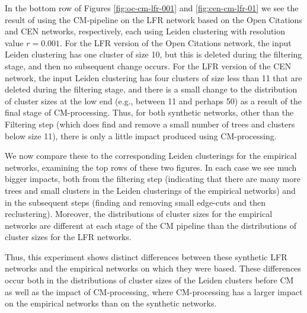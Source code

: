 \documentclass[11pt]{article}   	%
\begin{document}
In the bottom row of Figures \ref{fig:oc-cm-lfr-001} and  \ref{fig:cen-cm-lfr-01} we see the result of using the CM-pipeline on the LFR network based on the Open Citations  and CEN networks, respectively, each using Leiden clustering with
resolution value $r=0.001$.
For the LFR version of the Open Citations network, the input Leiden clustering has one cluster of size 10, but this is deleted during the filtering stage, and then no subsequent change occurs.
For the LFR version of the CEN network, the input Leiden clustering has four clusters of size less than 11 that are  deleted during the filtering stage, and there is a small change to the distribution of cluster sizes at the low end (e.g., between 11 and perhaps 50) as a result of the final stage of CM-processing.
Thus, for both synthetic networks, other than the Filtering step (which does find and remove a small number of trees and clusters below size 11), there is only a little
impact produced using CM-processing.

We now compare these to the corresponding Leiden clusterings for the empirical networks, examining the top rows of these two figures.
In each case we see much bigger impacts, both from the filtering step (indicating that there are many more  trees and small clusters in the Leiden clusterings of the empirical
networks) and in the subsequent steps (finding and removing small edge-cuts and then reclustering).
Moreover, the distributions of cluster sizes for the empirical networks are different at each stage of the CM pipeline than the distributions of cluster sizes for the LFR networks.

Thus, this experiment shows distinct differences between these synthetic LFR networks and the empirical networks on which they were based.
These differences occur both in the distributions of cluster sizes of the Leiden clusters before CM as well as the impact of CM-processing, where CM-processing has a larger impact on the empirical networks than on the synthetic networks.
\end{document}
